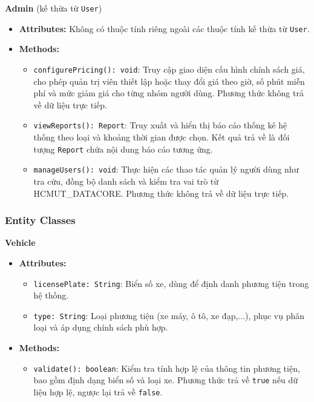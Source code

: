 \noindent\textbf{Admin} (kế thừa từ \texttt{User})
\begin{itemize}
	\item \textbf{Attributes:} Không có thuộc tính riêng ngoài các thuộc tính kế thừa từ \texttt{User}.
	\item \textbf{Methods:}
	\begin{itemize}
		\item \texttt{configurePricing(): void}: Truy cập giao diện cấu hình chính sách giá, cho phép quản trị viên thiết lập hoặc thay đổi giá theo giờ, số phút miễn phí và mức giảm giá cho từng nhóm người dùng. Phương thức không trả về dữ liệu trực tiếp.
		\item \texttt{viewReports(): Report}: Truy xuất và hiển thị báo cáo thống kê hệ thống theo loại và khoảng thời gian được chọn. Kết quả trả về là đối tượng \texttt{Report} chứa nội dung báo cáo tương ứng.
		\item \texttt{manageUsers(): void}: Thực hiện các thao tác quản lý người dùng như tra cứu, đồng bộ danh sách và kiểm tra vai trò từ \mbox{HCMUT\_DATACORE}. Phương thức không trả về dữ liệu trực tiếp.
	\end{itemize}
\end{itemize}

\subsubsection{Entity Classes}

\noindent\textbf{Vehicle}
\begin{itemize}
	\item \textbf{Attributes:}
	\begin{itemize}
		\item \texttt{licensePlate: String}: Biển số xe, dùng để định danh phương tiện trong hệ thống.
		\item \texttt{type: String}: Loại phương tiện (xe máy, ô tô, xe đạp,...), phục vụ phân loại và áp dụng chính sách phù hợp.
	\end{itemize}
	\item \textbf{Methods:}
	\begin{itemize}
		\item \texttt{validate(): boolean}: Kiểm tra tính hợp lệ của thông tin phương tiện, bao gồm định dạng biển số và loại xe. Phương thức trả về \texttt{true} nếu dữ liệu hợp lệ, ngược lại trả về \texttt{false}.
	\end{itemize}
\end{itemize}

